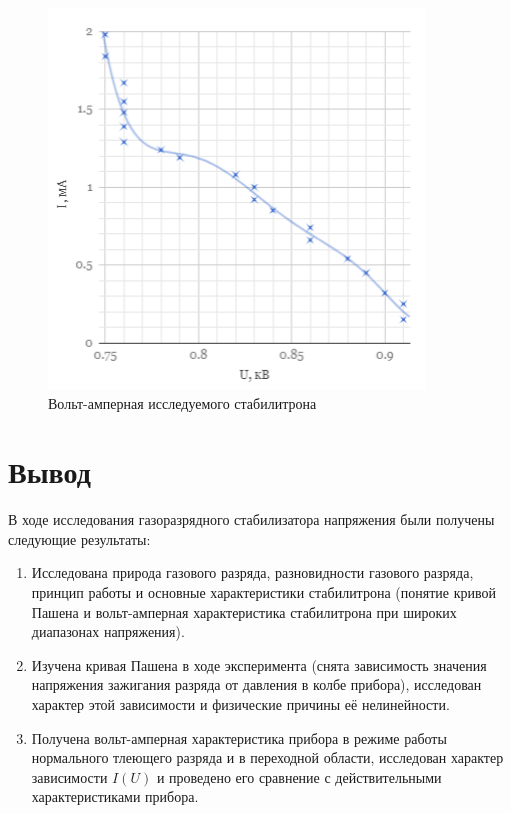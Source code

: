 \documentclass[a4paper]{article}
\begin{document}
\begin{figure}[h]
\begin{center}
\includegraphics[width=10cm]{vach.PNG}
\caption{Вольт-амперная исследуемого стабилитрона}
\label{ris:experimoriginal} %

\end{center}
\end{figure}

\section{Вывод}
В ходе исследования газоразрядного стабилизатора напряжения были получены следующие результаты:

\begin{enumerate}
    \item Исследована природа газового разряда, разновидности газового разряда, принцип работы и основные характеристики стабилитрона (понятие кривой Пашена и вольт-амперная характеристика стабилитрона при широких диапазонах напряжения).
    \item Изучена кривая Пашена в ходе эксперимента (снята зависимость значения напряжения зажигания разряда от давления в колбе прибора), исследован характер этой зависимости и физические причины её нелинейности.
    \item Получена вольт-амперная характеристика прибора в режиме работы нормального тлеющего разряда и в переходной области, исследован характер зависимости $I(U)$ и проведено его сравнение с действительными характеристиками прибора.
\end{enumerate}
\end{document}

